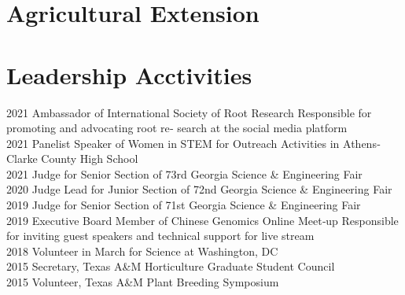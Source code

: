 \documentclass[11pt,a4paper,]{awesome-cv}
\begin{document}
\hypertarget{agricultural-extension}{%
\section{Agricultural Extension}\label{agricultural-extension}}

\begin{cventries}
\end{cventries}

\hypertarget{leadership-acctivities}{%
\section{Leadership Acctivities}\label{leadership-acctivities}}

2021 Ambassador of International Society of Root Research \textbar{}
Responsible for promoting and advocating root re‐ search at the social
media platform\\
2021 Panelist Speaker of Women in STEM for Outreach Activities in
Athens‐Clarke County High School\\
2021 Judge for Senior Section of 73rd Georgia Science \& Engineering
Fair\\
2020 Judge Lead for Junior Section of 72nd Georgia Science \&
Engineering Fair\\
2019 Judge for Senior Section of 71st Georgia Science \& Engineering
Fair\\
2019 Executive Board Member of Chinese Genomics Online Meet‐up
\textbar{} Responsible for inviting guest speakers and technical support
for live stream\\
2018 Volunteer in March for Science at Washington, DC\\
2015 Secretary, Texas A\&M Horticulture Graduate Student Council\\
2015 Volunteer, Texas A\&M Plant Breeding Symposium
\end{document}
